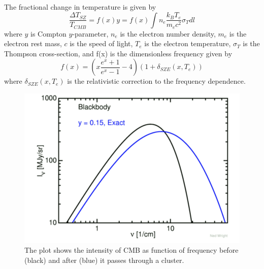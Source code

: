The fractional change in temperature is given by 
\begin{equation}
\label{eq:sz_eqn}
\frac{\Delta T_{SZ}}{T_{CMB}} = f(x) y = f(x) \int n_{e} \frac{k_{B}T_{e}}{m_{e}c^{2}} \sigma_{T} dl
\end{equation}
where $y$ is Compton $y$-parameter, $n_{e}$ is the electron number density, $m_{e}$ is the electron rest mass, $c$ is the speed of light,  $T_{e}$ is the electron temperature, $\sigma_{T}$ is the Thompson cross-section, and f(x) is the dimensionless frequency given by
\begin{equation}
f(x) = (x\frac{e^{x}+1}{e^{x}-1} -4)(1 + \delta_{SZE}(x,T_{e}))
\end{equation} 
where $\delta_{SZE}(x,T_{e})$ is the relativistic correction to the frequency dependence.
\begin{figure}
\includegraphics[width=\linewidth]{figs/tSZ_effect_Ned.png}
\caption{The plot shows the intensity of CMB as function of frequency before (black) and after (blue) it passes through a cluster. }
\label{ned_plot}
\end{figure}

